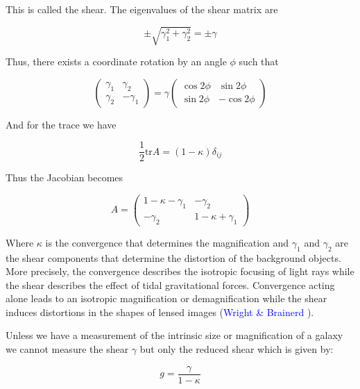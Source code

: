 This is called the shear. The eigenvalues of the shear matrix are 

\begin{equation}
\pm \sqrt{\gamma_1^2 + \gamma_2^2} = \pm \gamma
\end{equation}

Thus, there exists a coordinate rotation by an angle $\phi$ such that 

\begin{equation}
\left(\begin{array}{cc}
\gamma_{1} & \gamma_{2}\\
\gamma_{2} & -\gamma_{1}
\end{array}\right)=\gamma\left(\begin{array}{cc}
\cos2\phi & \sin2\phi\\
\sin2\phi & -\cos2\phi
\end{array}\right)
\end{equation}

And for the trace we have

\begin{equation}
\frac{1}{2}\text{tr}A=(1-\kappa)\delta_{ij}
\end{equation}

Thus the Jacobian becomes 

\begin{equation}
A= \left(\begin{array}{cc}
1-\kappa-\gamma_{1} & -\gamma_{2}\\
-\gamma_{2} & 1-\kappa+\gamma_{1}
\end{array}\right)
\end{equation}

Where $\kappa$ is the convergence that determines the magnification and $\gamma_{1}$ and $\gamma_{2}$ are the shear components that determine the distortion of the background objects. More precisely, the convergence describes the isotropic focusing of light rays while the shear describes the effect of tidal gravitational forces. Convergence acting alone leads to an isotropic magnification or demagnification while the shear induces distortions in the shapes of lensed images (\textcolor{blue}{Wright \& Brainerd} \citeyear{Reference4}). 

Unless we have a measurement of the intrinsic size or magnification of a galaxy we cannot measure the shear $\gamma$ but only the reduced shear which is given by:

\begin{equation}
g=\frac{\gamma}{1-\kappa}
\end{equation}

